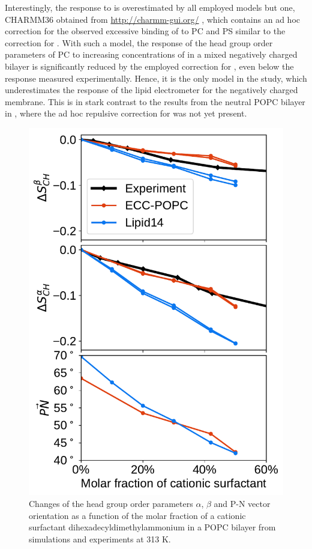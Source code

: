 Interestingly, the response to  is overestimated by all employed models but one, 
CHARMM36 obtained from \url{http://charmm-gui.org/} \citep{jo08, lee15},
which contains an ad hoc correction for the observed excessive binding of  to PC and PS similar to the correction for  \citep{venable13}. 
With such a model, the response of the head group order parameters of PC 
to increasing concentrations of  in a mixed negatively charged bilayer
is significantly reduced by the employed correction for , 
even below the response measured experimentally. 
Hence, it is the only model in the study,
which underestimates the response of the lipid electrometer for the negatively charged membrane. 
This is in stark contrast to the results from the neutral POPC bilayer in \citep{catte16}, 
where the ad hoc repulsive correction for  was not yet present.



\begin{figure}[tb!] 
  \centering 
  \includegraphics[width=\figwidth]{../img/ecc_popc/PN_angle_OrdPars-A-B_L14-ECCL17_q80_sig89_surf.pdf} 
  \caption{\label{OrderParameterCHANGESsurf} 
    Changes of the head group order parameters $\alpha$, $\beta$ and P-N vector orientation as a function of 
    the molar fraction of a cationic surfactant dihexadecyldimethylammonium in a POPC bilayer 
    from simulations and experiments \citep{scherer89} at 313 K.
  } 
\end{figure} 

